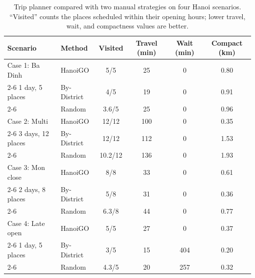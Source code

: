 \documentclass[a4paper,12pt]{report}
\begin{document}
\begin{table}[H]
\centering
\small
\renewcommand{\arraystretch}{1.2}
\caption[Trip planner compared with two manual strategies on four Hanoi scenarios]{Trip planner compared with two manual strategies on four Hanoi scenarios. ``Visited'' counts the places scheduled within their opening hours; lower travel, wait, and compactness values are better.}
\label{tab:planner_results}
\begin{tabular}{|l|l|c|c|c|c|}
\hline
\textbf{Scenario} & \textbf{Method} & \textbf{Visited} & \textbf{Travel (min)} & \textbf{Wait (min)} & \textbf{Compact (km)} \\ \hline
Case 1: Ba Dinh   & HanoiGO     & 5/5      & 25  & 0   & 0.80 \\ \cline{2-6}
1 day, 5 places   & By-District & 4/5      & 19  & 0   & 0.91 \\ \cline{2-6}
                  & Random      & 3.6/5    & 25  & 0   & 0.96 \\ \hline
Case 2: Multi     & HanoiGO     & 12/12    & 100 & 0   & 0.35 \\ \cline{2-6}
3 days, 12 places & By-District & 12/12    & 112 & 0   & 1.53 \\ \cline{2-6}
                  & Random      & 10.2/12  & 136 & 0   & 1.93 \\ \hline
Case 3: Mon close & HanoiGO     & 8/8      & 33  & 0   & 0.61 \\ \cline{2-6}
2 days, 8 places  & By-District & 5/8      & 31  & 0   & 0.36 \\ \cline{2-6}
                  & Random      & 6.3/8    & 44  & 0   & 0.77 \\ \hline
Case 4: Late open & HanoiGO     & 5/5      & 27  & 0   & 0.37 \\ \cline{2-6}
1 day, 5 places   & By-District & 3/5      & 15  & 404 & 0.20 \\ \cline{2-6}
                  & Random      & 4.3/5    & 20  & 257 & 0.32 \\ \hline
\end{tabular}
\end{table}
\end{document}
